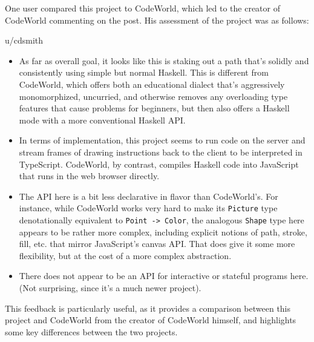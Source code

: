 \documentclass[../main.tex]{subfiles}
\begin{document}
            One user compared this project to CodeWorld, which led to the creator of
                CodeWorld commenting on the post.
            His assessment of the project was as follows:
            \begin{aquote}{u/cdsmith}
                \begin{itemize}
                    \item As far as overall goal, it looks like this is
                          staking out a path that's solidly and consistently using simple but normal
                          Haskell.
                          This is different from CodeWorld, which offers both an educational dialect
                              that's aggressively monomorphized, uncurried, and otherwise removes any
                              overloading type features that cause problems for beginners, but then also
                              offers a Haskell mode with a more conventional Haskell API.
                    \item In terms of implementation, this project seems to run code on the server and
                          stream frames of drawing instructions back to the client to be interpreted in
                          TypeScript.
                          CodeWorld, by contrast, compiles Haskell code into JavaScript that runs in the
                              web browser directly.
                    \item The API here is a bit less declarative in flavor than CodeWorld's.
                          For instance, while CodeWorld works very hard to make its \texttt{Picture} type
                              denotationally equivalent to \texttt{Point -> Color}, the analogous
                              \texttt{Shape} type here appears to be rather more complex, including explicit
                              notions of path, stroke, fill, etc. that mirror JavaScript's canvas API.
                          That does give it some more flexibility, but at the cost of a more complex
                              abstraction.
                    \item There does not appear to be an API for interactive or stateful programs here.
                          (Not surprising, since it's a much newer project).
                \end{itemize}
            \end{aquote}
            This feedback is particularly useful, as it provides a comparison between this
                project and CodeWorld from the creator of CodeWorld himself, and highlights
                some key differences between the two projects.
\end{document}
